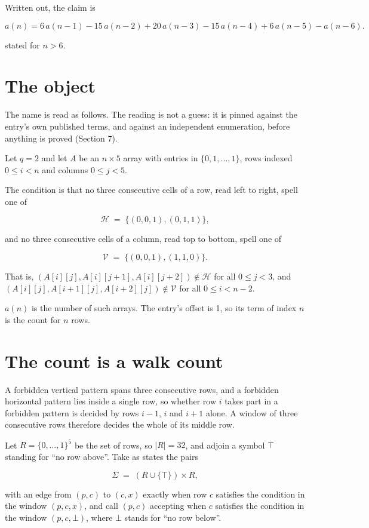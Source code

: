 \documentclass[11pt]{article}
\theoremstyle{definition}
\begin{document}
Written out, the claim is

\[a(n) = 6\,a(n-1) - 15\,a(n-2) + 20\,a(n-3) - 15\,a(n-4) + 6\,a(n-5) - a(n-6).\]

stated for $n > 6$.

\section{The object}

The name is read as follows. The reading is not a guess: it is pinned against the entry's own published terms, and against an independent enumeration, before anything is proved (Section 7).

Let $q = 2$ and let $A$ be an $n \times 5$ array with entries in $\{0,1,\dots,1\}$, rows indexed $0 \le i < n$ and columns $0 \le j < 5$.

The condition is that no three consecutive cells of a row, read left to right, spell one of

\[\mathcal{H} \;=\; \{(0,0,1), (0,1,1)\},\]

and no three consecutive cells of a column, read top to bottom, spell one of

\[\mathcal{V} \;=\; \{(0,0,1), (1,1,0)\}.\]

That is, $(A[i][j],A[i][j{+}1],A[i][j{+}2]) \notin \mathcal{H}$ for all $0 \le j < 3$, and $(A[i][j],A[i{+}1][j],A[i{+}2][j]) \notin \mathcal{V}$ for all $0 \le i < n-2$.

$a(n)$ is the number of such arrays. The entry's offset is 1, so its term of index $n$ is the count for $n$ rows.

\section{The count is a walk count}

A forbidden vertical pattern spans three consecutive rows, and a forbidden horizontal pattern lies inside a single row, so whether row $i$ takes part in a forbidden pattern is decided by rows $i-1$, $i$ and $i+1$ alone. A window of three consecutive rows therefore decides the whole of its middle row.

Let $R = \{0,\dots,1\}^{5}$ be the set of rows, so $|R| = 32$, and adjoin a symbol $\top$ standing for ``no row above''. Take as states the pairs

\[\Sigma \;=\; (R \cup \{\top\}) \times R,\]

with an edge from $(p,c)$ to $(c,x)$ exactly when row $c$ satisfies the condition in the window $(p,c,x)$, and call $(p,c)$ accepting when $c$ satisfies the condition in the window $(p,c,\bot)$, where $\bot$ stands for ``no row below''.
\end{document}
